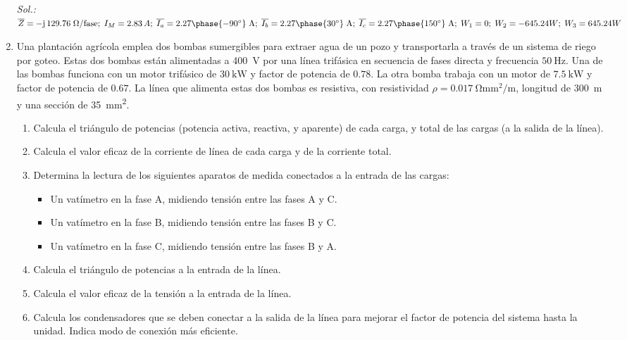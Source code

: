 \begin{enumerate}
  \emph{Sol.:
    $\overline{Z}={-\mathrm{j}\,129.76}\;\Omega\text{/fase};\;
    I_M=2.83\,A;\;\overline{I_{a}}={2.27\phase{-90^\circ}\;\text{A}};\;
    \overline{I_{b}}={2.27\phase{30^\circ}\;\text{A}};\;
    \overline{I_{c}}={2.27\phase{150^\circ}\;\text{A}};\; W_1=0;\;
    W_2=-645.24W;\; W_3=645.24W$}

\item  Una plantación agrícola emplea dos bombas sumergibles para extraer
 agua de un pozo y transportarla a través de un sistema de riego por
 goteo. Estas dos bombas están alimentadas a \SI{400}{\volt} por una
 línea trifásica en secuencia de fases directa y frecuencia
 $\SI{50}{\hertz}$. Una de las bombas funciona con un motor trifásico
 de $\SI{30}{\kilo\watt}$ y factor de potencia de $0.78$. La otra bomba
 trabaja con un motor de $\SI{7.5}{\kilo\watt}$ y factor de potencia
 de $0.67$.  La línea que alimenta estas dos bombas es resistiva, con
 resistividad $\rho = \SI{0.017}{\ohm\milli\meter\squared\per\meter}$,
 longitud de \SI{300}{m} y una sección de
 \SI{35}{\milli\meter\squared}.
 
 \begin{enumerate}
 \item Calcula el triángulo de potencias (potencia activa, reactiva, y
   aparente) de cada carga, y total de las cargas (a la salida de la
   línea).
 \item Calcula el valor eficaz de la corriente de línea de
   cada carga y de la corriente total.
 \item Determina la lectura de los siguientes aparatos de medida
   conectados a la entrada de las cargas:
   \begin{itemize}
   \item Un vatímetro en la fase A, midiendo tensión entre las fases A
     y C.
   \item Un vatímetro en la fase B, midiendo tensión entre las fases B
     y C.
   \item Un vatímetro en la fase C, midiendo tensión entre las fases B
     y A.
   \end{itemize}
 \item Calcula el triángulo de potencias a la entrada de la línea.
 \item Calcula el valor eficaz de la tensión a la entrada de la línea.
 \item Calcula los condensadores que se deben conectar a la salida de
   la línea para mejorar el factor de potencia del sistema hasta la
   unidad. Indica modo de conexión más eficiente.
 \end{enumerate}


\end{enumerate}
